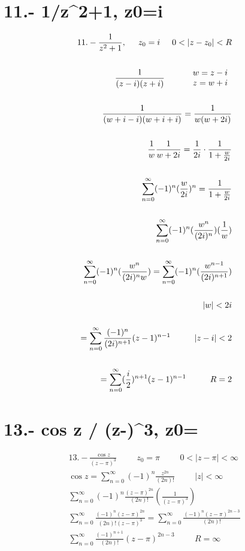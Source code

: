 \documentclass{article}
\begin{document}
\section*{11.- 1/z^2+1, z0=i}
\begin{align*}
11.- \frac{1}{z^2 + 1}, \hspace{0.5cm} z_0 = i \hspace{0.5cm} 0 < |z - z_0| < R \\
\\
\frac{1}{(z-i)(z+i)} \hspace{1cm} \begin{array}{l} w = z - i \\ z = w + i \end{array} \\
\\
\frac{1}{(w + i - i)(w + i + i)} = \frac{1}{w(w + 2i)} \\
\\
\frac{1}{w} \frac{1}{w + 2i} = \frac{1}{2i} \cdot \frac{1}{1 + \frac{w}{2i}} \\
\\
\sum_{n=0}^\infty (-1)^n (\frac{w}{2i})^n = \frac{1}{1 + \frac{w}{2i}} \\
\\
\sum_{n=0}^\infty (-1)^n (\frac{w^n}{(2i)^n}) (\frac{1}{w}) \\
\\
\sum_{n=0}^\infty (-1)^n (\frac{w^n}{(2i)^n w}) = \sum_{n=0}^\infty (-1)^n (\frac{w^{n-1}}{(2i)^{n+1}}) \\
\\
|w| < 2i \\
\\
= \sum_{n=0}^\infty \frac{(-1)^n}{(2i)^{n+1}} (z - 1)^{n-1} \hspace{1cm} |z - i| < 2 \\
\\
= \sum_{n=0}^\infty (\frac{i}{2})^{n+1} (z - 1)^{n-1} \hspace{1cm} R = 2
\end{align*}
\section*{13.- cos z / (z-\pi)^3, z0=\pi}
\begin{align*}
13.- \frac{\cos z}{(z-\pi)^3} \hspace{1cm} z_0 = \pi \hspace{1cm} 0 < |z - \pi| < \infty \\
\cos z = \sum_{n=0}^\infty (-1)^n \frac{z^{2n}}{(2n)!} \hspace{1cm} |z| < \infty \\
\sum_{n=0}^\infty (-1)^n \frac{(z-\pi)^{2n}}{(2n)!} (\frac{1}{(z-\pi)^3}) \\
\sum_{n=0}^\infty \frac{(-1)^n (z-\pi)^{2n}}{(2n)!(z-\pi)^3} = \sum_{n=0}^\infty \frac{(-1)^n (z-\pi)^{2n-3}}{(2n)!} \\
\sum_{n=0}^\infty \frac{(-1)^{n+1}}{(2n)!} (z-\pi)^{2n-3} \hspace{1cm} R = \infty \\
\\
\end{align*}
\end{document}
